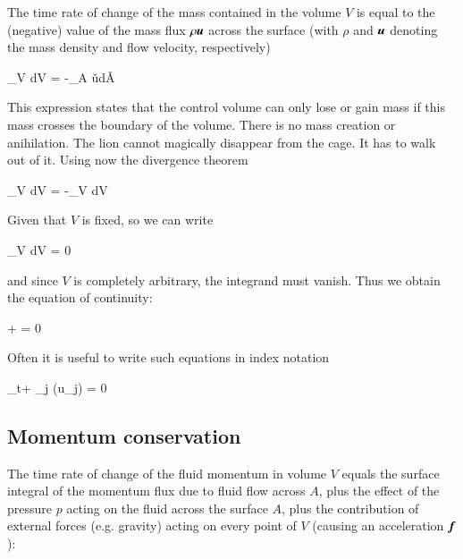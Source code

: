 The time rate of change of the mass contained in the volume $V$ is equal to the (negative)
value of the mass flux $\rho {\boldsymbol{u}}$ across the surface (with $\rho$ and ${\boldsymbol{u}}$ denoting the mass density and
flow velocity, respectively)

\beq
{} \int_V \rho dV = -\oint_A \rho \v{u}\cdot d\v{A} 
\eeq

This expression states that the control volume can only lose or gain
mass if this mass crosses the boundary of the volume. There is no mass
creation or anihilation. The lion cannot magically disappear from the
cage. It has to walk out of it. Using now the divergence theorem 

\beq
{} \int_V \rho dV = -\int_V dV
\eeq

\noindent Given that $V$ is fixed, so we can write

\beq
\int_V dV = 0 
\eeq

\noindent and since $V$ is completely arbitrary, the integrand must vanish. Thus we obtain the
equation of continuity:

\beq
\ptderiv{\rho} +  = 0
\label{eq:continuity-conservative}
\eeq


Often it is useful to write such equations in index notation 

\beq
\partial_t\rho + \partial_j \left(\rho u_j\right) = 0 
\eeq


\subsection{Momentum conservation}

The time rate of change of the fluid momentum in volume $V$ equals the surface integral
of the momentum flux due to fluid flow across $A$, plus the eﬀect of the pressure $p$ acting
on the fluid across the surface $A$, plus the contribution of external forces (e.g. gravity)
acting on every point of $V$ (causing an acceleration ${\boldsymbol{f}}$):

